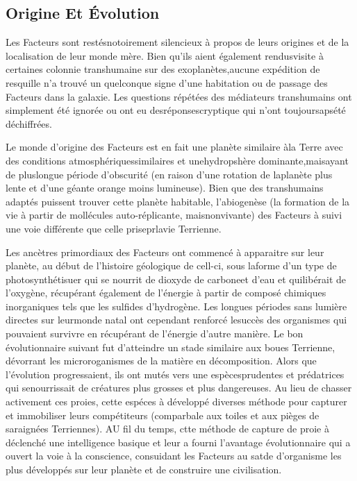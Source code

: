 \subsection{Origine Et Évolution} 

Les Facteurs sont restésnotoirement silencieux à propos de leurs origines et de la localisation de leur monde mère. Bien qu'ils aient également rendusvisite à certaines colonnie transhumaine sur des exoplanètes,aucune expédition de resquille n'a trouvé un quelconque signe d'une habitation ou de passage des Facteurs dans la galaxie. Les questions répétées des médiateurs transhumains ont simplement été ignorée ou ont eu desréponsescryptique qui n'ont toujoursapsété déchiffrées. 

Le monde d'origine des Facteurs est en fait une planète similaire àla Terre avec des conditions atmosphériquessimilaires et unehydropshère dominante,maisayant de pluslongue période d'obscurité (en raison d'une rotation de laplanète plus lente et d'une géante orange moins lumineuse). Bien que des transhumains adaptés puissent trouver cette planète habitable, l'abiogenèse (la formation de la vie à partir de mollécules auto-réplicante, maisnonvivante) des Facteurs à suivi une voie différente que celle priseprlavie Terrienne. 

Les ancètres primordiaux des Facteurs ont commencé à apparaitre sur leur planète, au début de l'histoire géologique de cell-ci, sous laforme d'un type de photosynthétisuer qui se nourrit de dioxyde de carboneet d'eau et quilibérait de l'oxygène, récupérant également de l'énergie à partir de composé chimiques inorganiques tels que les sulfides d'hydrogène. Les longues périodes sans lumière directes sur leurmonde natal ont cependant renforcé lesuccès des organismes qui pouvaient survivre en récupérant de l'énergie d'autre manière. Le bon évolutionnaire suivant fut d'atteindre un stade similaire aux boues Terrienne, dévorrant les microroganismes de la matière en décomposition. Alors que l'évolution progressaient, ils ont mutés vers une espècesprudentes et prédatrices qui senourrissait de créatures plus grosses et plus dangereuses. Au lieu de chasser activement ces proies, cette espéces à développé diverses méthode pour capturer et immobiliser leurs compétiteurs (comparbale aux toiles et aux pièges de saraignées Terriennes). AU fil du temps, ctte méthode de capture de proie à déclenché une intelligence basique et leur a fourni l'avantage évolutionnaire qui a ouvert la voie à la conscience, consuidant les Facteurs au satde d'organisme les plus développés sur leur planète et de construire une civilisation. 



